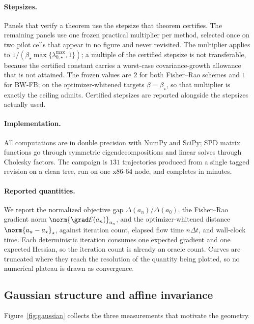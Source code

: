 \paragraph{Stepsizes.}
Panels that verify a theorem use the stepsize that theorem certifies. The
remaining panels use one frozen practical multiplier per method, selected once on
two pilot cells that appear in no figure and never revisited. The multiplier
applies to $1/(\beta_\star\max\{\lambda_{0,\star}^{\max},1\})$; a multiple of the
certified stepsize is not transferable, because the certified constant carries a
worst-case covariance-growth allowance that is not attained. The frozen values
are $2$ for both Fisher--Rao schemes and $1$ for BW-FB; on the optimizer-whitened
targets $\beta=\beta_\star$, so that multiplier is exactly the ceiling
\cite{diao2023forward} admits. Certified stepsizes are
reported alongside the stepsizes actually used.

\paragraph{Implementation.}
All computations are in double precision with NumPy and SciPy; SPD matrix
functions go through symmetric eigendecompositions and linear solves through
Cholesky factors. The campaign is $131$ trajectories produced from a single
tagged revision on a clean tree, run on one x86-64 node, and completes in minutes.

\paragraph{Reported quantities.}
We report the normalized objective gap $\Delta(a_n)/\Delta(a_0)$, the Fisher--Rao
gradient norm $\norm{\grad\mathcal E(a_n)}_{a_n}$, and the optimizer-whitened
distance $\norm{a_n-a_\star}_\star$, against iteration count, elapsed flow time
$n\Delta t$, and wall-clock time. Each deterministic iteration consumes one
expected gradient and one expected Hessian, so the iteration count is already an
oracle count. Curves are truncated where they reach the resolution of the
quantity being plotted, so no numerical plateau is drawn as convergence.

\subsection{Gaussian structure and affine invariance}
\label{subsec:numerics-gaussian}

Figure~\ref{fig:gaussian} collects the three measurements that motivate the
geometry.

